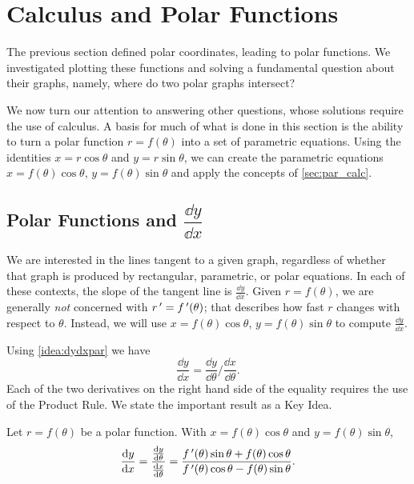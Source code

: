 \section{Calculus and Polar Functions} \label{sec:polarcalc}

The previous section defined polar coordinates, leading to polar functions. We investigated plotting these functions and solving a fundamental question about their graphs, namely, where do two polar graphs intersect?

We now turn our attention to answering other questions, whose solutions require the use of calculus. A basis for much of what is done in this section is the ability to turn a polar function $r=f(\theta)$ into a set of parametric equations. Using the identities $x=r\cos \theta$ and $y=r\sin \theta$, we can create the parametric equations $x=f(\theta)\cos\theta$, $y=f(\theta)\sin\theta$ and apply the concepts of \autoref{sec:par_calc}.

\subsection{Polar Functions and \texorpdfstring{$\dfrac{\dd y}{\dd x}$}{dy/dx}}

We are interested in the lines tangent to a given graph, regardless of whether that graph is produced by rectangular, parametric, or polar equations. In each of these contexts, the slope of the tangent line is $\frac{\dd y}{\dd x}$. Given $r=f(\theta)$, we are generally \emph{not} concerned with $r\,'=f\,'(\theta)$; that describes how fast $r$ changes with respect to $\theta$. Instead, we will use $x=f(\theta)\cos\theta$, $y=f(\theta)\sin\theta$ to compute $\frac{\dd y}{\dd x}$. 

Using \autoref{idea:dydxpar} we have
\[\frac{\dd y}{\dd x} = \frac{\dd y}{\dd\theta}\Big/\frac{\dd x}{\dd\theta}.\]
Each of the two derivatives on the right hand side of the equality requires the use of the Product Rule. We state the important result as a Key Idea.

\begin{keyidea}\label{idea:dydxpol}%
Let $r=f(\theta)$ be a polar function. With $x=f(\theta)\cos\theta$ and $y=f(\theta)\sin\theta$,
\[
 \frac{\operatorname{d}\! y}{\operatorname{d}\! x}
 =\frac{\frac{\operatorname{d}\! y}{\operatorname{d}\!\theta}}{\frac{\operatorname{d}\! x}{\operatorname{d}\!\theta}}
 =\frac{f\,'(\theta)\sin\theta+f(\theta)\cos\theta}{f\,'(\theta)\cos\theta-f(\theta)\sin\theta}.
\]
\end{keyidea}

